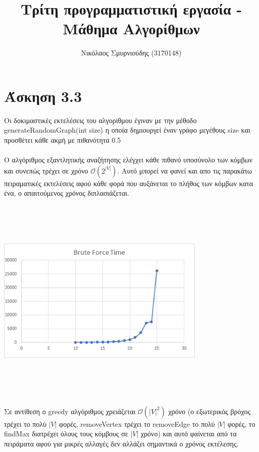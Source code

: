 \documentclass{article}
\renewcommand{\O}{\mathcal{O}}
\begin{document}
\author{Νικόλαος Σμυρνιούδης (3170148)}
\title{Τρίτη προγραμματιστική εργασία - Μάθημα Αλγορίθμων}
\maketitle
\section{Άσκηση 3.3}
Οι δοκιμαστικές εκτελέσεις του αλγορίθμου έγιναν με την μέθοδο \\generateRandomGraph(int size) η οποία
δημιουργεί έναν γράφο μεγέθους size και προσθέτει κάθε ακμή με πιθανότητα 0.5 \\
\\
Ο αλγόριθμος εξαντλητικής αναζήτησης ελέγχει κάθε πιθανό υποσύνολο των κόμβων και συνεπώς τρέχει σε
χρόνο $\O(2^{|V|})$. Αυτό μπορεί να φανεί και απο τις παρακάτω πειραματικές εκτελέσεις αφού κάθε φορά που αυξάνεται
το πλήθος των κόμβων κατα ένα, ο απαιτούμενος χρόνος διπλασιάζεται. 
\begin{center}
\includegraphics[width=10cm,height=10cm,keepaspectratio]{bruteforcetime}\\
\end{center}
Σε αντίθεση ο greedy αλγόριθμος χρειάζεται $\O(|V|^2)$ χρόνο (ο εξωτερικός βρόχος
τρέχει το πολύ $|V|$ φορές, removeVertex τρέχει το removeEdge το πολύ $|V|$ φορές, το findMax διατρέχει όλους τους κόμβους σε $|V|$ χρόνο)
και αυτό φαίνεται από τα πειράματα αφού για μικρές αλλαγές
δεν αλλάζει σημαντικά ο χρόνος εκτέλεσης.
\end{document}
